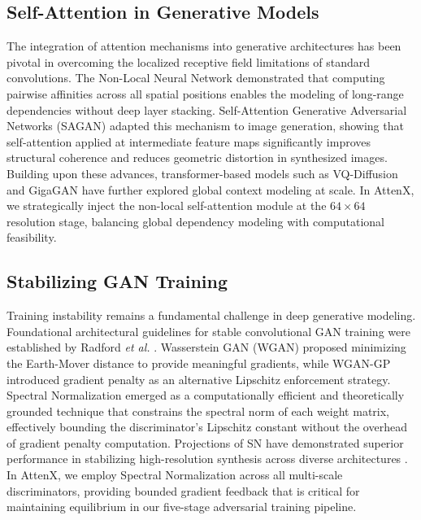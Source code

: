 \documentclass[conference]{IEEEtran}
\begin{document}
\subsection{Self-Attention in Generative Models}
The integration of attention mechanisms into generative architectures has been pivotal in overcoming the localized receptive field limitations of standard convolutions. The Non-Local Neural Network \cite{wang2018nonlocal} demonstrated that computing pairwise affinities across all spatial positions enables the modeling of long-range dependencies without deep layer stacking. Self-Attention Generative Adversarial Networks (SAGAN) \cite{zhang2019selfattention} adapted this mechanism to image generation, showing that self-attention applied at intermediate feature maps significantly improves structural coherence and reduces geometric distortion in synthesized images. Building upon these advances, transformer-based models such as VQ-Diffusion \cite{gu2022vqdiffusion} and GigaGAN \cite{kim2023gigagan} have further explored global context modeling at scale. In AttenX, we strategically inject the non-local self-attention module at the $64 \times 64$ resolution stage, balancing global dependency modeling with computational feasibility.

\subsection{Stabilizing GAN Training}
Training instability remains a fundamental challenge in deep generative modeling. Foundational architectural guidelines for stable convolutional GAN training were established by Radford \textit{et al.} \cite{radford2016dcgan}. Wasserstein GAN (WGAN) \cite{arjovsky2017wasserstein} proposed minimizing the Earth-Mover distance to provide meaningful gradients, while WGAN-GP \cite{gulrajani2017improved} introduced gradient penalty as an alternative Lipschitz enforcement strategy. Spectral Normalization \cite{miyato2018spectral} emerged as a computationally efficient and theoretically grounded technique that constrains the spectral norm of each weight matrix, effectively bounding the discriminator's Lipschitz constant without the overhead of gradient penalty computation. Projections of SN have demonstrated superior performance in stabilizing high-resolution synthesis across diverse architectures \cite{brock2019large}. In AttenX, we employ Spectral Normalization across all multi-scale discriminators, providing bounded gradient feedback that is critical for maintaining equilibrium in our five-stage adversarial training pipeline.
\end{document}
